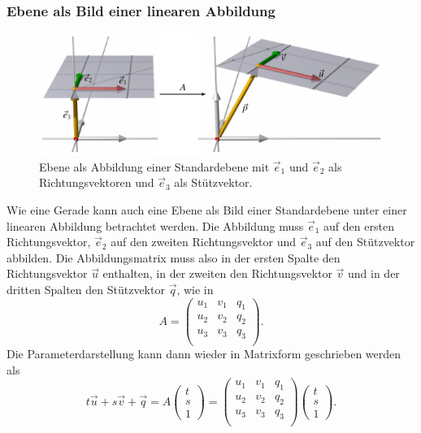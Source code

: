 \subsubsection{Ebene als Bild einer linearen Abbildung}
\begin{figure}
\centering
\includegraphics{3/images/abb.pdf}
\caption{Ebene als Abbildung einer Standardebene mit $\vec{e}_1$ und
$\vec{e}_2$ als Richtungsvektoren und $\vec{e}_3$ als Stützvektor.
\label{skript:affin:ebeneabb}}
\end{figure}
Wie eine Gerade kann auch eine Ebene als Bild einer Standardebene
unter einer linearen Abbildung betrachtet werden.
Die Abbildung muss $\vec{e}_1$ auf den ersten Richtungsvektor,
$\vec{e}_2$ auf den zweiten Richtungsvektor und $\vec{e}_3$ auf den
Stützvektor abbilden.
Die Abbildungsmatrix muss also in der ersten Spalte den Richtungsvektor
$\vec{u}$ enthalten, in der zweiten den Richtungsvektor $\vec{v}$ und in
der dritten Spalten den Stützvektor $\vec{q}$, wie in
\[
A=\begin{pmatrix}
u_1&v_1&q_1\\
u_2&v_2&q_2\\
u_3&v_3&q_3\\
\end{pmatrix}.
\]
Die Parameterdarstellung kann dann wieder in Matrixform geschrieben werden
als
\[
t\vec{u}+s\vec{v}+\vec{q}
=
A
\begin{pmatrix}t\\s\\1\end{pmatrix}
=
\begin{pmatrix}
u_1&v_1&q_1\\
u_2&v_2&q_2\\
u_3&v_3&q_3\\
\end{pmatrix}
\begin{pmatrix}t\\s\\1\end{pmatrix}.
\]

